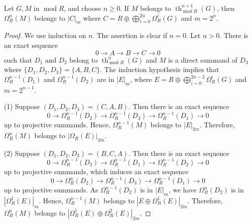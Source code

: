 \documentclass[10pt,a4paper]{amsart}
\begin{document}
\begin{lemma}\label{lem:large_thickening_to_extension_decompositions}
    Let $G,M$ in $ \operatorname{mod}R$, and choose $n\geq 0$. If $M$ belongs to $\operatorname{th}_{\operatorname{mod}R}^{n+1}(G)$, then $\Omega_R^n (M)$ belongs to $|C|_m$ where $C=R\oplus\bigoplus_{i=0}^{2n}\Omega_R^i (G)$ and $m=2^n$.
\end{lemma}

\begin{proof}
    We use induction on $n$. The assertion is clear if $n=0$. Let $n>0$.
    There is an exact sequence
    \begin{displaymath}
        0 \to A \to B \to C \to 0
    \end{displaymath}
    such that $D_1$ and $D_2$ belong to $\operatorname{th}_{\operatorname{mod}R}^n (G)$ and $M$ is a direct summand of $D_3$
    where $\{D_1,D_2,D_3\}=\{A,B,C\}$. The induction hypothesis implies that
    $\Omega_R^{n-1}(D_1)$ and $\Omega_R^{n-1}(D_2)$ are in $|E|_m$, where
    $E=R\oplus\bigoplus_{i=0}^{2n-2}\Omega_R^i (G)$ and $m=2^{n-1}$.

    (1) Suppose $(D_1,D_2,D_3)=(C,A,B)$. Then there is an exact sequence
    \begin{displaymath}
        0 \to \Omega_R^{n-1}(D_2) \to \Omega_R^{n-1}(D_3) \to \Omega_R^{n-1}(D_1) \to 0
    \end{displaymath}
    up to projective summands. Hence, $\Omega_R^{n-1}(M)$ belongs to $|E|_{2m}$.
    Therefore, $\Omega_R^n (M)$ belongs to $|\Omega_R (E)|_{2m}$.

    (2) Suppose $(D_1,D_2,D_3)=(B,C,A)$. Then there is an exact sequence
    \begin{displaymath}
        0 \to \Omega_R^{n-1}(D_3) \to \Omega_R^{n-1}(D_1) \to \Omega_R^{n-1}(D_2) \to 0
    \end{displaymath}
    up to projective summands, which induces an exact sequence
    \begin{displaymath}
        0 \to \Omega_R^n (D_2) \to \Omega_R^{n-1}(D_3) \to \Omega_R^{n-1}(D_1) \to 0
    \end{displaymath}
    up to projective summands. As $\Omega_R^{n-1} (D_2)$ is in $|E|_m$, we have
    $\Omega^n_R (D_2)$ is in $|\Omega_R^1 (E)|_m$. Hence, $\Omega_R^{n-1}(M)$ belongs to $|E\oplus\Omega_R^1 (E)|_{2m}$. Therefore, $\Omega^n_R (M)$ belongs to $|\Omega_R^1 (E)\oplus\Omega_R^2(E)|_{2m}$.


\end{proof}
\end{document}
